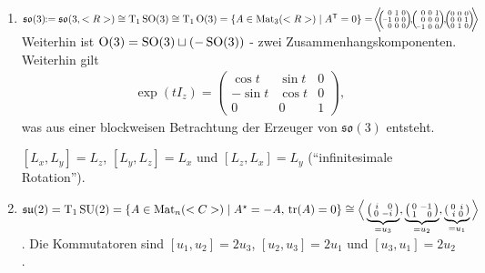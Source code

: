 \begin{example}
\begin{enumerate}[label={(\arabic*)}]
		\item $\mathfrak{so}(3) \!\!:= \mathfrak{so}(3,\R)\cong \T_1\SO(3)\cong\T_1 \Orth(3) = \{A\in\Mat_3(\R)\mid \transpose A = 0\} = \!\bigg\langle\!\! \Big(\!\!\begin{smallmatrix}
			\phantom{\scriptscriptstyle-}0 & 1 & 0 \\ \raisebox{0.2ex}{$\scriptscriptstyle-$}1 & 0 & 0\\ \phantom{\scriptscriptstyle-}0 & 0 & 0
		\end{smallmatrix}\!\Big)\!,\!\!\Big(\!\!\begin{smallmatrix}
			\phantom{\scriptscriptstyle-}0 & 0 & 1 \\ \phantom{\scriptscriptstyle-}0 & 0 & 0 \\ \raisebox{0.2ex}{$\scriptscriptstyle-$}1 & 0 & 0
		\end{smallmatrix}\!\Big)\!,\!\!\Big(\!\begin{smallmatrix}
			0 & 0 & 0 \\ 0 & 0 & 1 \\ 0 & 1 & 0
		\end{smallmatrix}\!\Big)\!\!\bigg\rangle$ Weiterhin ist $\operatorname{O}(3) = \operatorname{SO}(3)\sqcup (-\operatorname{SO}(3))$ - zwei Zusammenhangskomponenten. Weiterhin gilt \begin{align*}
			\exp(t I_z) = \begin{pmatrix}
				\cos t & \sin t & 0 \\ -\sin t & \cos t & 0 \\ 0 & 0 & 1
			\end{pmatrix},
		\end{align*}
		was aus einer blockweisen Betrachtung der Erzeuger von $\mathfrak{so}(3)$ entsteht.
		
		$[L_x,L_y] = L_z$, $[L_y,L_z] = L_x$ und $[L_z,L_x] = L_y$ ("`infinitesimale Rotation"').
		
		\item $\mathfrak{su}(2) = \T_1 \SU(2) = \{A\in\Mat_n(\C)\mid A^\star = -A,\,\tr(A) = 0\}\cong\Big\langle \underbrace{\begin{psmallmatrix*}[r]
			i&0\\0&-i
		\end{psmallmatrix*}}_{=u_3},\underbrace{\begin{psmallmatrix*}[r]
			0&-1\\1&0
		\end{psmallmatrix*}}_{=u_2},\underbrace{\begin{psmallmatrix*}[r]
			0&i\\i&0
		\end{psmallmatrix*}}_{=u_1}\Big\rangle$.
		Die Kommutatoren sind $[u_1,u_2] = 2u_3$, $[u_2,u_3] = 2u_1$ und $[u_3,u_1] = 2u_2$.
		

\end{enumerate}
\end{example}
